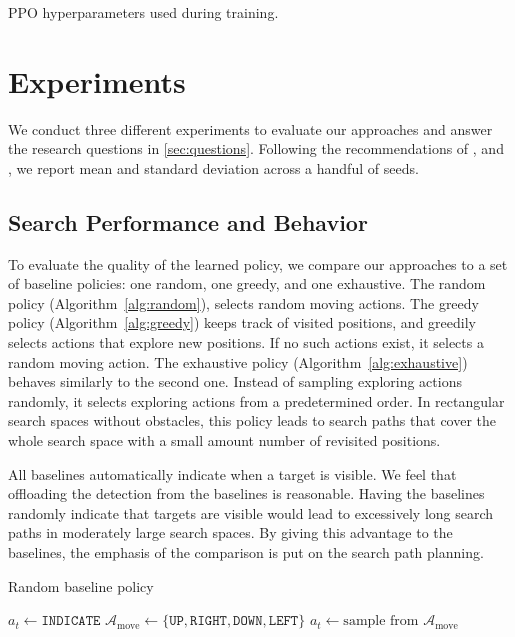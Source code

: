 \begin{table}
    \centering
    \caption[PPO hyperparameters]{PPO hyperparameters used during training.}
    
    \label{tab:hyperparameters}
\end{table}

\section{Experiments}
\label{sec:experiments}

We conduct three different experiments to evaluate our approaches and answer the research questions in \ref{sec:questions}. 
Following the recommendations of \cite{henderson_deep_2018}, \cite{colas_hitchhikers_2019} and \cite{agarwal_deep_2022}, we report mean and standard deviation across a handful of seeds.

\subsection{Search Performance and Behavior}

To evaluate the quality of the learned policy, we compare our approaches to a set of baseline policies: one random, one greedy, and one exhaustive.
The random policy (Algorithm~\ref{alg:random}), selects random moving actions.
The greedy policy (Algorithm~\ref{alg:greedy}) keeps track of visited positions, and greedily selects actions that explore new positions.
If no such actions exist, it selects a random moving action.
The exhaustive policy (Algorithm~\ref{alg:exhaustive}) behaves similarly to the second one.
Instead of sampling exploring actions randomly, it selects exploring actions from a predetermined order.
In rectangular search spaces without obstacles, this policy leads to search paths that cover the whole search space with a small amount number of revisited positions.

All baselines automatically indicate when a target is visible.
We feel that offloading the detection from the baselines is reasonable.
Having the baselines randomly indicate that targets are visible would lead to excessively long search paths in moderately large search spaces.
By giving this advantage to the baselines, the emphasis of the comparison is put on the search path planning.

\begin{algorithm}
    \caption{Random baseline policy}
    \label{alg:random}
    \begin{algorithmic}
            \State \(a_t \leftarrow \mathtt{INDICATE}\)
        \Else
            \State \(\mathcal{A}_{\text{move}} \leftarrow \{\mathtt{UP}, \mathtt{RIGHT}, \mathtt{DOWN}, \mathtt{LEFT}\}\)
            \State \(a_t \leftarrow \text{sample from } \mathcal{A}_{\text{move}}\)
        \EndIf
    \end{algorithmic}
\end{algorithm}

